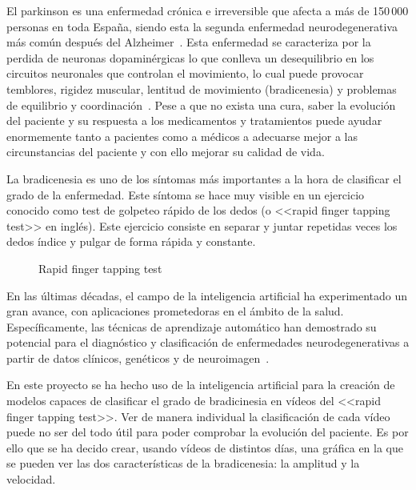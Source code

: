 
El parkinson es una enfermedad crónica e irreversible que afecta a más de 150\,000 personas en toda España, siendo esta la segunda enfermedad neurodegenerativa más común después del Alzheimer~\cite{brainsci11081027}. Esta enfermedad se caracteriza por la perdida de neuronas dopaminérgicas lo que conlleva un desequilibrio en los circuitos neuronales que controlan el movimiento, lo cual puede provocar temblores, rigidez muscular, lentitud de movimiento (bradicenesia) y problemas de equilibrio y coordinación~\cite{Poewe_Seppi_Tanner_Halliday_Brundin_Volkmann_Schrag_Lang_2017}.
Pese a que no exista una cura, saber la evolución del paciente y su respuesta a los medicamentos y tratamientos puede ayudar enormemente tanto a pacientes como a médicos a adecuarse mejor a las circunstancias del paciente y con ello mejorar su calidad de vida.
 
La bradicenesia es uno de los síntomas más importantes a la hora de clasificar el grado de la enfermedad. Este síntoma se hace muy visible en un ejercicio conocido como test de golpeteo rápido de los dedos (o <<rapid finger tapping test>> en inglés). Este ejercicio consiste en separar y juntar repetidas veces los dedos índice y pulgar de forma rápida y constante.


\begin{figure}
    \centering
    \caption{Rapid finger tapping test}
    \label{fig:finger-tapping-test}
\end{figure}

En las últimas décadas, el campo de la inteligencia artificial ha experimentado un gran avance, con aplicaciones prometedoras en el ámbito de la salud. Específicamente, las técnicas de aprendizaje automático han demostrado su potencial para el diagnóstico y clasificación de enfermedades neurodegenerativas a partir de datos clínicos, genéticos y de neuroimagen~\cite{CardiacCare}.

En este proyecto se ha hecho uso de la inteligencia artificial para la creación de modelos capaces de clasificar el grado de bradicinesia en vídeos del <<rapid finger tapping test>>. Ver de manera individual la clasificación de cada vídeo puede no ser del todo útil para poder comprobar la evolución del paciente. Es por ello que se ha decido crear, usando vídeos de distintos días, una gráfica en la que se pueden ver las dos características de la bradicenesia: la amplitud y la velocidad. 